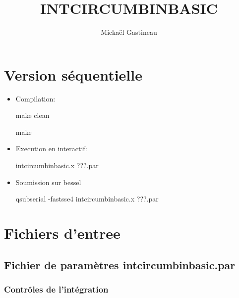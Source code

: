 \documentclass[11pt]{article}
\title{INTCIRCUMBINBASIC}
\author{Micka\"el Gastineau}
\begin{document}
\maketitle

\section{Version s\'equentielle}

\begin{itemize}
 \item Compilation:  
 
make clean

make
 
\item Execution en interactif: 

intcircumbinbasic.x  ???.par
\item Soumission sur bessel

qsubserial -fastsse4 intcircumbinbasic.x  ???.par
\end{itemize}


\section{Fichiers d'entree}

\subsection{Fichier de param\`etres  intcircumbinbasic.par}

\subsubsection*{Contr\^oles de l'int\'egration}
\end{document}
